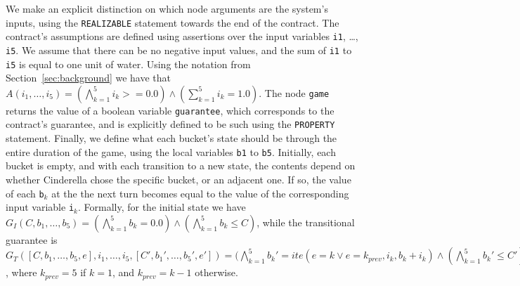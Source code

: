 We make an explicit distinction on which node arguments are the system's inputs, using the \texttt{REALIZABLE} statement towards the end of the contract. The contract's
assumptions are defined using assertions over the input variables
\texttt{i1}, \ldots, \texttt{i5}. We assume that there can be no negative input values, and the
sum of \texttt{i1} to \texttt{i5} is equal to one unit of water. Using the notation from Section~\ref{sec:background} we have that $A(i_1, \ldots, i_5) = (\bigwedge_{k=1}^{5} i_k >= 0.0) \land (\sum_{k=1}^{5} i_{k} = 1.0)$. The node \texttt{game} returns the value of a boolean variable \texttt{guarantee}, which corresponds to
the contract's guarantee, and is explicitly defined to be such using the
\texttt{PROPERTY} statement. Finally, we define what each bucket's state should be through the entire
duration of the game, using the local variables \texttt{b1} to \texttt{b5}.
Initially, each bucket is empty, and with each transition to a new state, the contents depend on
whether Cinderella chose the specific bucket, or an adjacent one. If so, the value of each \texttt{b}$_k$ at the the next turn becomes equal to the value of the corresponding input variable \texttt{i}$_k$. Formally, for the initial state we have $G_{I}(C, b_1, \ldots, b_5) = (\bigwedge_{k=1}^{5} b_k = 0.0) \land (\bigwedge_{k = 1}^{5} b_k \le C)$, while the transitional guarantee is $G_T([C,b_1, \ldots, b_5, e], i_1, \ldots, i_5, [C',b_{1}', \ldots, b_{5}',e']) = (\bigwedge_{k=1}^{5} b_{k}' = ite(e = k \lor e = k_{prev}, i_k, b_k + i_k) \land (\bigwedge_{k=1}^{5} b_{k}' \le C')$, where $k_{prev} = 5$ if $k = 1$, and $k_{prev} = k - 1$ otherwise.

